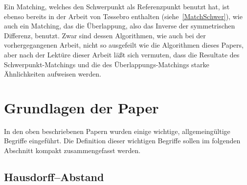 Ein Matching, welches den Schwerpunkt als Referenzpunkt benutzt hat, ist ebenso bereits in der Arbeit von T\o{}ssebro enthalten (siehe~\vref{MatchSchwer}), wie auch ein Matching, das die Überlappung, also das Inverse der symmetrischen Differenz, benutzt. Zwar sind dessen Algorithmen, wie auch bei der vorhergegangenen Arbeit, nicht so ausgefeilt wie die Algorithmen dieses Papers, aber nach der Lektüre dieser Arbeit läßt sich vermuten, dass die Resultate des Schwerpunkt-Matchings und die des Überlappungs-Matchings starke Ähnlichkeiten aufweisen werden. 

\section{Grundlagen der Paper}
In den oben beschriebenen Papern wurden einige wichtige, allgemeingültige Begriffe eingeführt. Die Definition dieser wichtigen Begriffe sollen im folgenden Abschnitt kompakt zusammengefasst werden.

\subsection{Hausdorff--Abstand}\label{Hausdorff} 

